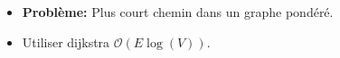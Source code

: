 \begin{frame}
    \frametitle{\problemtitle}
    \begin{itemize}
        \item<+-> \textbf{Problème:} Plus court chemin dans un graphe pondéré.
        \item<+-> Utiliser dijkstra $\mathcal O(E \log (V))$.
    \end{itemize}
    \solvestats
\end{frame}
